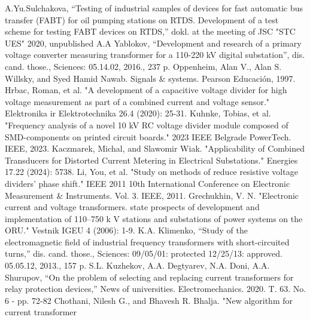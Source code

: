 A.Yu.Sulchakova, “Testing of industrial samples of devices for fast automatic bus transfer
(FABT) for oil pumping stations on RTDS. Development of a test scheme for testing FABT
devices on RTDS,” dokl. at the meeting of JSC "STC UES" 2020, unpublished
A.A Yablokov, “Development and research of a primary voltage converter measuring
transformer for a 110-220 kV digital substation”, dis. cand. those., Sciences: 05.14.02,
2016., 237 p.
Oppenheim, Alan V., Alan S. Willsky, and Syed Hamid Nawab. Signals \& systems. Pearson
Educación, 1997.
Hrbac, Roman, et al. "A development of a capacitive voltage divider for high voltage
measurement as part of a combined current and voltage sensor." Elektronika ir
Elektrotechnika 26.4 (2020): 25-31.
Kuhnke, Tobias, et al. "Frequency analysis of a novel 10 kV RC voltage divider module
composed of SMD-components on printed circuit boards." 2023 IEEE Belgrade PowerTech. IEEE,
2023.
Kaczmarek, Michal, and Slawomir Wiak. "Applicability of Combined Transducers for Distorted
Current Metering in Electrical Substations." Energies 17.22 (2024): 5738.
Li, You, et al. "Study on methods of reduce resistive voltage dividers' phase shift." IEEE
2011 10th International Conference on Electronic Measurement \& Instruments. Vol. 3. IEEE,
2011.
Grechukhin, V. N. "Electronic current and voltage transformers. state prospects of
development and implementation of 110–750 k V stations and substations of power systems on
the ORU." Vestnik IGEU 4 (2006): 1-9.
K.A. Klimenko, “Study of the electromagnetic field of industrial frequency transformers
with short-circuited turns,” dis. cand. those., Sciences: 09/05/01: protected 12/25/13:
approved. 05.05.12, 2013., 157 p.
S.L. Kuzhekov, A.A. Degtyarev, N.A. Doni, A.A. Shurupov, “On the problem of selecting and
replacing current transformers for relay protection devices,” News of universities.
Electromechanics. 2020. T. 63. No. 6 - pp. 72-82
Chothani, Nilesh G., and Bhavesh R. Bhalja. "New algorithm for current transformer

